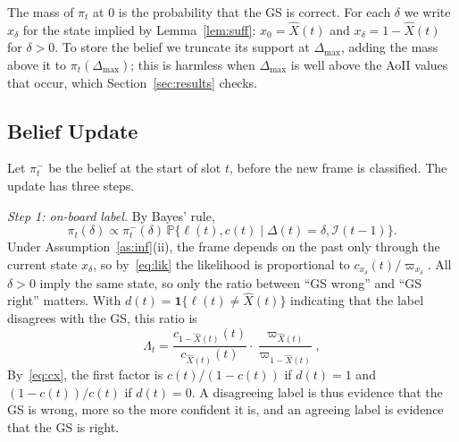 \documentclass[10pt,journal,compsoc]{IEEEtran}
\theoremstyle{remark}
\newcommand{\Prob}{\mathbb{P}}
\newcommand{\ind}[1]{\mathbf{1}\{#1\}}
\newcommand{\I}{\mathcal{I}}
\newcommand{\lab}{\ell}
\begin{document}
The mass of $\pi_t$ at $0$ is the probability that the GS is correct. For each $\delta$ we write $x_\delta$ for the state implied by Lemma~\ref{lem:suff}: $x_0=\hat X(t)$ and $x_\delta=1-\hat X(t)$ for $\delta>0$. To store the belief we truncate its support at $\Delta_{\max}$, adding the mass above it to $\pi_t(\Delta_{\max})$; this is harmless when $\Delta_{\max}$ is well above the AoII values that occur, which Section~\ref{sec:results} checks.


\subsection{Belief Update}\label{sec:update}
Let $\pi^-_t$ be the belief at the start of slot $t$, before the new frame is classified. The update has three steps.

\emph{Step 1: on-board label.} By Bayes' rule,
\begin{equation}\label{eq:bayes}
\pi_t(\delta)\propto\pi^-_t(\delta)\,\Prob\big\{\lab(t),c(t)\mid\Delta(t)=\delta,\I(t-1)\big\}.
\end{equation}
Under Assumption~\ref{as:inf}(ii), the frame depends on the past only through the current state $x_\delta$, so by~\eqref{eq:lik} the likelihood is proportional to $c_{x_\delta}(t)/\varpi_{x_\delta}$. All $\delta>0$ imply the same state, so only the ratio between ``GS wrong'' and ``GS right'' matters. With $d(t)=\ind{\lab(t)\neq\hat X(t)}$ indicating that the label disagrees with the GS, this ratio is
\begin{equation}\label{eq:Lambda}
\Lambda_t=\frac{c_{1-\hat X(t)}(t)}{c_{\hat X(t)}(t)}\cdot\frac{\varpi_{\hat X(t)}}{\varpi_{1-\hat X(t)}},
\end{equation}
By~\eqref{eq:cx}, the first factor is $c(t)/(1-c(t))$ if $d(t)=1$ and $(1-c(t))/c(t)$ if $d(t)=0$. A disagreeing label is thus evidence that the GS is wrong, more so the more confident it is, and an agreeing label is evidence that the GS is right.
\end{document}
